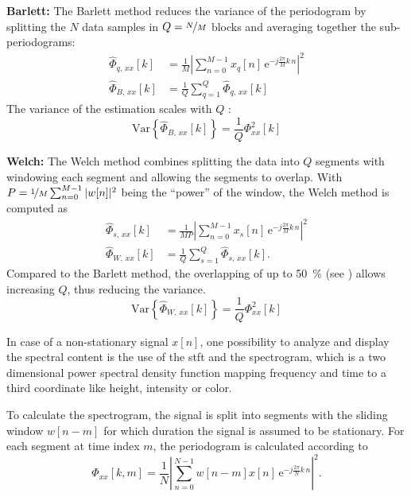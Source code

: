 \textbf{Barlett:} The Barlett method reduces the variance of the periodogram by splitting the $N$ data samples in $Q=\nicefrac{N}{M}$ blocks and averaging together the sub-periodograms:
\begin{align}
\hat{\Phi}_{q,\,xx}[k] &= \frac{1}{M} \left| \sum_{n=0}^{M-1} x_q[n]\,\text{e}^{-j\frac{2\pi}{M}k\,n}\right|^2\\
\hat{\Phi}_{B,\,xx}[k] &= \frac{1}{Q} \sum_{q=1}^{Q} \hat{\Phi}_{q,\,xx}[k]
\end{align}
The variance of the estimation scales with $Q$ \cite[p.~6]{Rowell2008}:
\begin{equation}
\text{Var}\left\{\hat{\Phi}_{B,\,xx}[k]\right\} = \frac{1}{Q}\Phi_{xx}^2[k]
\end{equation}

\textbf{Welch:} The Welch method combines splitting the data into $Q$ segments with windowing each segment and allowing the segments to overlap. With $P = \nicefrac{1}{M} \sum_{n=0}^{M-1} |w[n]|^2$ being the ``power'' of the window, the Welch method is computed as
\begin{align}
\hat{\Phi}_{s,\,xx}[k] &= \frac{1}{M P} \left| \sum_{n=0}^{M-1} x_s[n]\,\text{e}^{-j\frac{2\pi}{M}k\,n}\right|^2\\
\hat{\Phi}_{W,\,xx}[k] &= \frac{1}{Q} \sum_{s=1}^{Q} \hat{\Phi}_{s,\,xx}[k].
\end{align}
Compared to the Barlett method, the overlapping of up to \SI{50}{\percent} (see \cite{Welch1967}) allows increasing $Q$, thus reducing the variance.
\begin{equation}\label{eq:varWelch}
\text{Var}\left\{\hat{\Phi}_{W,\,xx}[k]\right\} = \frac{1}{Q}\Phi_{xx}^2[k]
\end{equation}


In case of a non-stationary signal $x[n]$, one possibility to analyze and display the spectral content is the use of the \gls{stft} and the spectrogram, which is a two dimensional power spectral density function mapping frequency and time to a third coordinate like height, intensity or color.

To calculate the spectrogram, the signal is split into segments with the sliding window $w[n-m]$ for which duration the signal is assumed to be stationary. For each segment at time index $m$, the periodogram is calculated according to
\begin{equation}
\hat{\Phi}_{xx}[k,m] = \frac{1}{N} \left| \sum_{n=0}^{N-1} w[n-m] x[n]\,\text{e}^{-j\frac{2\pi}{N}k\,n}\right|^2.
\end{equation}










